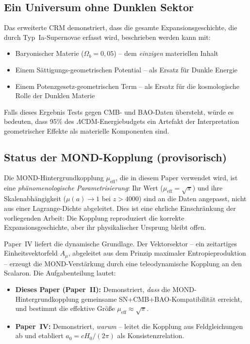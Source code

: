 \documentclass[aps,prd,twocolumn,superscriptaddress,nofootinbib]{revtex4-2}
\begin{document}
\subsection{Ein Universum ohne Dunklen Sektor}

Das erweiterte CRM demonstriert, dass die gesamte Expansionsgeschichte, die durch Typ~Ia-Supernovae erfasst wird, beschrieben werden kann mit:
\begin{itemize}
\item Baryonischer Materie ($\Omega_b = 0{,}05$) -- dem \textit{einzigen} materiellen Inhalt
\item Einem S\"attigungs-geometrischen Potential -- als Ersatz f\"ur Dunkle Energie
\item Einem Potenzgesetz-geometrischen Term -- als Ersatz f\"ur die kosmologische Rolle der Dunklen Materie
\end{itemize}

Falls dieses Ergebnis Tests gegen CMB- und BAO-Daten \"ubersteht, w\"urde es bedeuten, dass 95\% des $\Lambda$CDM-Energiebudgets ein Artefakt der Interpretation geometrischer Effekte als materielle Komponenten sind.

\subsection{Status der MOND-Kopplung (provisorisch)}
\label{subsec:mond_status}

Die MOND-Hintergrundkopplung $\mu_{\mathrm{eff}}$, die in diesem Paper verwendet wird, ist eine \emph{ph\"anomenologische Parametrisierung}: Ihr Wert ($\mu_{\mathrm{eff}} = \sqrt{\pi}$) und ihre Skalenabh\"angigkeit ($\mu(a) \to 1$ bei $z > 4000$) sind an die Daten angepasst, nicht aus einer Lagrange-Dichte abgeleitet. Dies ist eine ehrliche Einschr\"ankung der vorliegenden Arbeit: Die Kopplung reproduziert die korrekte Expansionsgeschichte, aber ihr physikalischer Ursprung bleibt offen.

Paper~IV \cite{Geiger2026d} liefert die dynamische Grundlage. Der Vektorsektor -- ein zeitartiges Einheitsvektorfeld $A_\mu$, abgeleitet aus dem Prinzip maximaler Entropieproduktion -- erzeugt die MOND-Verst\"arkung durch eine teleodynamische Kopplung an den Scalaron. Die Aufgabenteilung lautet:
\begin{itemize}
\item \textbf{Dieses Paper (Paper~II):} Demonstriert, \emph{dass} die MOND-Hintergrundkopplung gemeinsame SN+CMB+BAO-Kompatibilit\"at erreicht, und bestimmt die effektive Größe $\mu_{\mathrm{eff}} \approx \sqrt{\pi}$.
\item \textbf{Paper~IV:} Demonstriert, \emph{warum} -- leitet die Kopplung aus Feldgleichungen ab und etabliert $a_0 = cH_0/(2\pi)$ als Konsistenzrelation.
\end{itemize}
\end{document}
